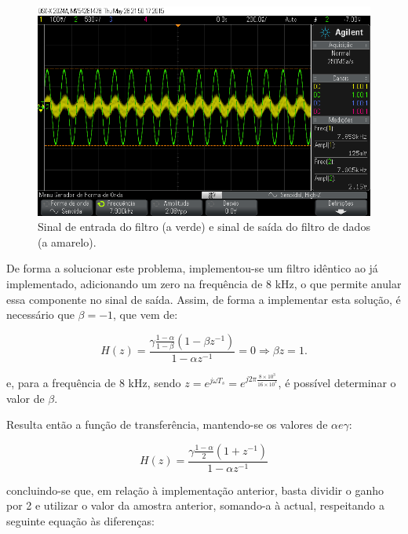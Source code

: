 \documentclass[11pt]{article}
\numberwithin{equation}{section}
\begin{document}
\begin{figure}[H]
	\centering
	\includegraphics[keepaspectratio=true, scale=0.37]{exps/FiltroSemZero8k}
	\caption{Sinal de entrada do filtro (a verde) e sinal de saída do filtro de dados (a amarelo).}
	\vspace{-0.8em}
\end{figure} 

De forma a solucionar este problema, implementou-se um filtro idêntico ao já implementado, adicionando um zero na frequência de 8 kHz, o que permite anular essa componente no sinal de saída. Assim, de forma a implementar esta solução, é necessário que $\beta = -1$, que vem de:

\vspace{-3mm}
\begin{equation}
H(z) = \frac{\gamma \frac{1-\alpha}{1-\beta} (1-\beta z^{-1})}{1-\alpha z^{-1}} = 0 \Rightarrow \beta z = 1.
\end{equation}

\vspace{1mm}
e, para a frequência de 8 kHz, sendo $z = e^{j\omega T_s} = e^{j2\pi \frac{8\times 10^3}{16\times 10^3}}$, é possível determinar o valor de $\beta$.
	
Resulta então a função de transferência, mantendo-se os valores de $\alpha e \gamma$:

\vspace{-3mm}
\begin{equation}
H(z) = \frac{\gamma \frac{1-\alpha}{2} (1+z^{-1})}{1-\alpha z^{-1}}
\end{equation}

\vspace{1mm}
concluindo-se que, em relação à implementação anterior, basta dividir o ganho por 2 e utilizar o valor da amostra anterior, somando-a à actual, respeitando a seguinte equação às diferenças:
\end{document}
